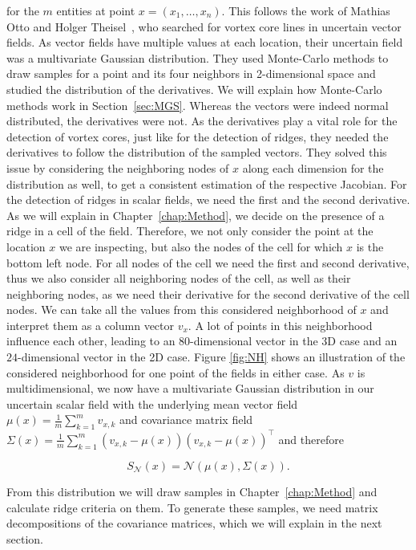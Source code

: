 \noindent for the $m$ entities at point $x = (x_1,\dots,x_n)$. This
follows the work of Mathias Otto and Holger Theisel~\cite{Vortex},
who searched for vortex core lines in uncertain vector fields. As vector
fields have multiple values at each location, their uncertain field was
a multivariate Gaussian distribution. They used Monte-Carlo methods to
draw samples for a point and its four neighbors in 2-dimensional space
and studied the distribution of the derivatives. We will explain how
Monte-Carlo methods work in Section~\ref{sec:MGS}. Whereas the vectors
were indeed normal distributed, the derivatives were not. As the
derivatives play a vital role for the detection of vortex cores, just
like for the detection of ridges, they needed the derivatives to follow
the distribution of the sampled vectors. They solved this issue by
considering the neighboring nodes of $x$ along each dimension for
the distribution as well, to get a consistent estimation of the
respective Jacobian. For the detection of ridges in scalar fields,
we need the first and the second derivative. As we will explain in
Chapter~\ref{chap:Method}, we decide on the presence of a ridge in
a cell of the field. Therefore, we not only consider the point at
the location $x$ we are inspecting, but also the nodes of the cell
for which $x$ is the bottom left node. For all nodes of the cell we
need the first and second derivative, thus we also consider all
neighboring nodes of the cell, as well as their neighboring nodes, as we
need their derivative for the second derivative of the cell nodes. We
can take all the values from this considered neighborhood of $x$ and
interpret them as a column vector $v_x$. A lot of points in this
neighborhood influence each other, leading to an $80$-dimensional vector
in the 3D case and an $24$-dimensional vector in the 2D case. Figure
\ref{fig:NH} shows an illustration of the considered neighborhood for
one point of the fields in either case. As $v$ is multidimensional, we
now have a multivariate Gaussian distribution in our uncertain scalar
field with the underlying mean vector field $\mu(x) = \frac{1}{m}
\sum_{k=1}^m v_{x,k}$ and covariance matrix field $\Sigma(x)=
\frac{1}{m} \sum_{k=1}^m (v_{x,k} - \mu(x)){(v_{x,k} - \mu{(x)})}^\top$
and therefore

\begin{equation}
  S_{\mathcal{N}}(x) = \mathcal{N}(\mu(x), \Sigma(x)).
\end{equation}

From this distribution we will draw samples in Chapter~\ref{chap:Method}
and calculate ridge criteria on them. To generate these samples, we
need matrix decompositions of the covariance matrices, which we will
explain in the next section.

